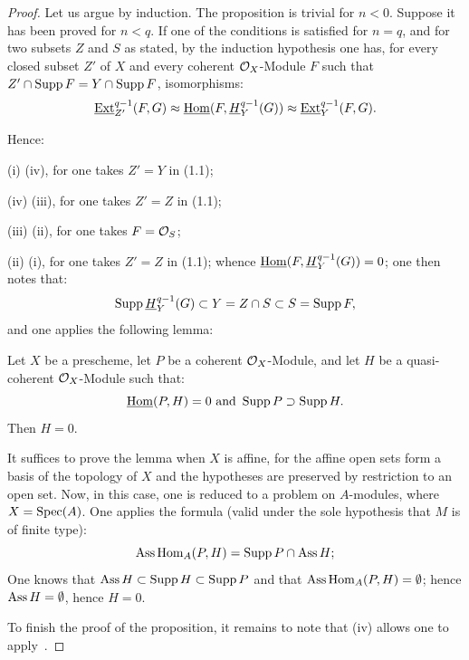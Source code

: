\begin{proof}
Let us argue by induction. The proposition is trivial for $n < 0$. Suppose it has been proved for $n < q$. If one of the conditions is satisfied for $n = q$, and for two subsets $Z$ and $S$ as stated, by the induction hypothesis one has, for every closed subset $Z'$ of $X$ and every coherent $\mathcal{O}_X$-Module $F$ such that $Z' \cap \operatorname{Supp} F = Y \cap \operatorname{Supp} F$, isomorphisms:
\begin{equation}\label{eq:VII.1.1}\operatorname{\underline{Ext}}^{q-1}_{Z'} (F, G) \approx \operatorname{\underline{Hom}} (F, \underline{H}^{q-1}_Y (G)) \approx \operatorname{\underline{Ext}}^{q-1}_Y (F, G).\end{equation}

\noindent Hence:

(i) \ALORS (iv), for one takes $Z' = Y$ in (1.1);

(iv) \ALORS (iii), for one takes $Z' = Z$ in (1.1);

(iii) \ALORS (ii), for one takes $F = {\mathcal O}_S$;

(ii) \ALORS (i), for one takes $Z' = Z$ in (1.1); whence $\operatorname{\underline{Hom}} (F, \underline{H}_Y^{q-1} (G)) = 0$; one then notes that:
\[
\operatorname{Supp} \underline{H}_Y^{q-1} (G) \subset Y = Z \cap S \subset S = \operatorname{Supp} F,
\]
and one applies the following lemma:

\begin{lemma} \label{VII.1.3}
Let $X$ be a prescheme, let $P$ be a coherent $\mathcal{O}_X$-Module, and let $H$ be a quasi-coherent $\mathcal{O}_X$-Module such that:
\[
\operatorname{\underline{Hom}} (P, H) = 0 \text{ and } \operatorname{Supp} P \supset \operatorname{Supp} H.
\]
Then $H = 0$.
\end{lemma}

It suffices to prove the lemma when $X$ is affine, for the affine open sets form a basis of the topology of $X$ and the hypotheses are preserved by restriction to an open set. Now, in this case, one is reduced to a problem on $A$-modules, where $X = \operatorname{Spec}(A)$. One applies the formula (valid under the sole hypothesis that $M$ is of finite type):
\[
\operatorname{Ass} \operatorname{Hom}_A (P, H) = \operatorname{Supp} P \cap \operatorname{Ass} H;\]
One knows that $\operatorname{Ass} H \subset \operatorname{Supp} H \subset \operatorname{Supp} P$ and that $\operatorname{Ass} \operatorname{Hom}_A (P, H) = \emptyset$; hence $\operatorname{Ass} H = \emptyset$, hence $H = 0$.

To finish the proof of the proposition, it remains to note that (iv) allows one to apply~.
\skipqed
\end{proof}

